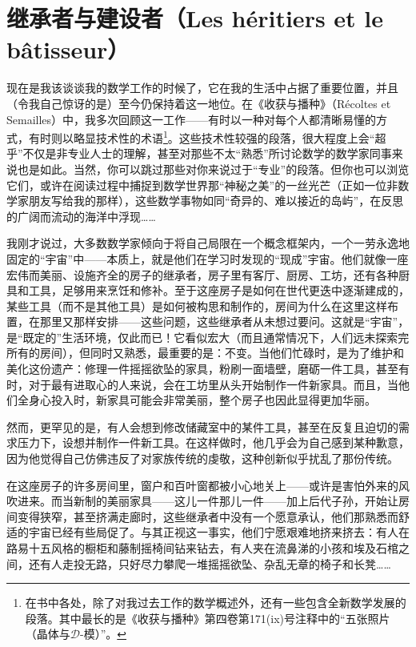 \section*{继承者与建设者（Les héritiers et le bâtisseur）}

现在是我该谈谈我的数学工作的时候了，它在我的生活中占据了重要位置，并且（令我自己惊讶的是）至今仍保持着这一地位。在《收获与播种》（Récoltes et Semailles）中，我多次回顾这一工作——有时以一种对每个人都清晰易懂的方式，有时则以略显技术性的术语\footnote{在书中各处，除了对我过去工作的数学概述外，还有一些包含全新数学发展的段落。其中最长的是《收获与播种》第四卷第171(ix)号注释中的“五张照片（晶体与$\mathscr{D}$-模）”。}。这些技术性较强的段落，很大程度上会“超乎”不仅是非专业人士的理解，甚至对那些不太“熟悉”所讨论数学的数学家同事来说也是如此。当然，你可以跳过那些对你来说过于“专业”的段落。但你也可以浏览它们，或许在阅读过程中捕捉到数学世界那“神秘之美”的一丝光芒（正如一位非数学家朋友写给我的那样），这些数学事物如同“奇异的、难以接近的岛屿”，在反思的广阔而流动的海洋中浮现……

我刚才说过，大多数数学家倾向于将自己局限在一个概念框架内，一个一劳永逸地固定的“宇宙”中——本质上，就是他们在学习时发现的“现成”宇宙。他们就像一座宏伟而美丽、设施齐全的房子的继承者，房子里有客厅、厨房、工坊，还有各种厨具和工具，足够用来烹饪和修补。至于这座房子是如何在世代更迭中逐渐建成的，某些工具（而不是其他工具）是如何被构思和制作的，房间为什么在这里这样布置，在那里又那样安排——这些问题，这些继承者从未想过要问。这就是“宇宙”，是“既定的”生活环境，仅此而已！它看似宏大（而且通常情况下，人们远未探索完所有的房间），但同时又熟悉，最重要的是：不变。当他们忙碌时，是为了维护和美化这份遗产：修理一件摇摇欲坠的家具，粉刷一面墙壁，磨砺一件工具，甚至有时，对于最有进取心的人来说，会在工坊里从头开始制作一件新家具。而且，当他们全身心投入时，新家具可能会非常美丽，整个房子也因此显得更加华丽。

然而，更罕见的是，有人会想到修改储藏室中的某件工具，甚至在反复且迫切的需求压力下，设想并制作一件新工具。在这样做时，他几乎会为自己感到某种歉意，因为他觉得自己仿佛违反了对家族传统的虔敬，这种创新似乎扰乱了那份传统。

在这座房子的许多房间里，窗户和百叶窗都被小心地关上——或许是害怕外来的风吹进来。而当新制的美丽家具——这儿一件那儿一件——加上后代子孙，开始让房间变得狭窄，甚至挤满走廊时，这些继承者中没有一个愿意承认，他们那熟悉而舒适的宇宙已经有些局促了。与其正视这一事实，他们宁愿艰难地挤来挤去：有人在路易十五风格的橱柜和藤制摇椅间钻来钻去，有人夹在流鼻涕的小孩和埃及石棺之间，还有人走投无路，只好尽力攀爬一堆摇摇欲坠、杂乱无章的椅子和长凳……

